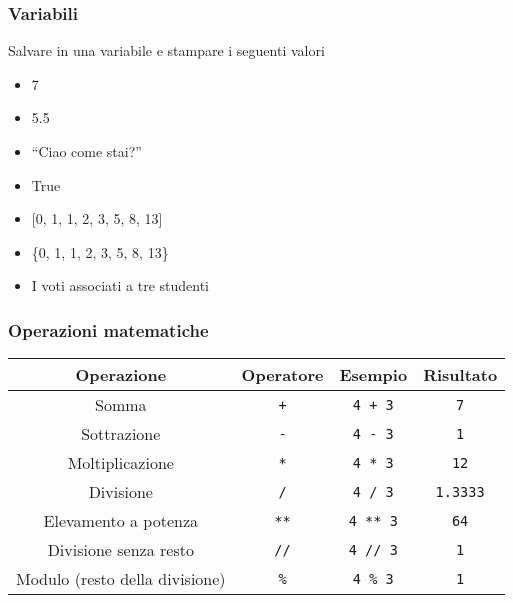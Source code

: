 \begin{exerciseframe}
    \frametitle{Variabili}

    Salvare in una variabile e stampare i seguenti valori
    \begin{itemize}
        \item 7\pause
        \item 5.5\pause
        \item ``Ciao come stai?''\pause
        \item True\pause
        \item{} [0, 1, 1, 2, 3, 5, 8, 13]\pause
        \item \{0, 1, 1, 2, 3, 5, 8, 13\}\pause
        \item I voti associati a tre studenti
    \end{itemize}
\end{exerciseframe}

\begin{contentframe}
    \frametitle{Operazioni matematiche}

    \centering
    \begin{tabular}{c|c|c|c}
        Operazione                      & Operatore     & Esempio           & Risultato         \\
        \midrule
        \midrule
        Somma                           & \texttt{+}    & \texttt{4 + 3}    & \texttt{7}        \\
        Sottrazione                     & \texttt{-}    & \texttt{4 - 3}    & \texttt{1}        \\
        Moltiplicazione                 & \texttt{*}    & \texttt{4 * 3}    & \texttt{12}       \\
        Divisione                       & \texttt{/}    & \texttt{4 / 3}    & \texttt{1.3333}   \\
        \midrule
        Elevamento a potenza            & \texttt{**}   & \texttt{4 ** 3}   & \texttt{64}       \\
        Divisione senza resto           & \texttt{//}   & \texttt{4 // 3}   & \texttt{1}        \\
        Modulo (resto della divisione)  & \texttt{\%}   & \texttt{4 \% 3}   & \texttt{1}        \\
    \end{tabular}
\end{contentframe}

